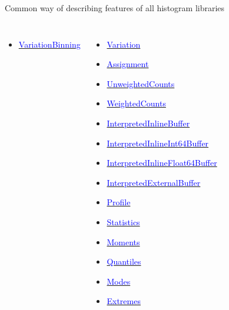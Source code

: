 \documentclass[aspectratio=169]{beamer}
\begin{document}
\begin{frame}{Common way of describing features of all histogram libraries}
\begin{columns}[t]
\begin{itemize}
  \item \href{https://github.com/scikit-hep/aghast/blob/master/specification.adoc\#variationbinning}{\textcolor{blue}{VariationBinning}}
\end{itemize}
\begin{itemize}
  \item \href{https://github.com/scikit-hep/aghast/blob/master/specification.adoc\#variation}{\textcolor{blue}{Variation}}
  \item \href{https://github.com/scikit-hep/aghast/blob/master/specification.adoc\#assignment}{\textcolor{blue}{Assignment}}
  \item \href{https://github.com/scikit-hep/aghast/blob/master/specification.adoc\#unweightedcounts}{\textcolor{blue}{UnweightedCounts}}
  \item \href{https://github.com/scikit-hep/aghast/blob/master/specification.adoc\#weightedcounts}{\textcolor{blue}{WeightedCounts}}
  \item \href{https://github.com/scikit-hep/aghast/blob/master/specification.adoc\#interpretedinlinebuffer}{\textcolor{blue}{InterpretedInlineBuffer}}
  \item \href{https://github.com/scikit-hep/aghast/blob/master/specification.adoc\#interpretedinlineint64buffer}{\textcolor{blue}{InterpretedInlineInt64Buffer}}
  \item \href{https://github.com/scikit-hep/aghast/blob/master/specification.adoc\#interpretedinlinefloat64buffer}{\textcolor{blue}{InterpretedInlineFloat64Buffer}}
  \item \href{https://github.com/scikit-hep/aghast/blob/master/specification.adoc\#interpretedexternalbuffer}{\textcolor{blue}{InterpretedExternalBuffer}}
  \item \href{https://github.com/scikit-hep/aghast/blob/master/specification.adoc\#profile}{\textcolor{blue}{Profile}}
  \item \href{https://github.com/scikit-hep/aghast/blob/master/specification.adoc\#statistics}{\textcolor{blue}{Statistics}}
  \item \href{https://github.com/scikit-hep/aghast/blob/master/specification.adoc\#moments}{\textcolor{blue}{Moments}}
  \item \href{https://github.com/scikit-hep/aghast/blob/master/specification.adoc\#quantiles}{\textcolor{blue}{Quantiles}}
  \item \href{https://github.com/scikit-hep/aghast/blob/master/specification.adoc\#modes}{\textcolor{blue}{Modes}}
  \item \href{https://github.com/scikit-hep/aghast/blob/master/specification.adoc\#extremes}{\textcolor{blue}{Extremes}}

\end{itemize}
\end{columns}
\end{frame}
\end{document}
